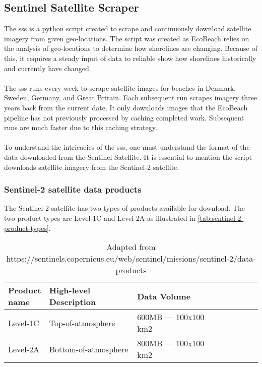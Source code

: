 \subsection{Sentinel Satellite Scraper}\label{subsec:sentinel-satellite-scraper}
The \acrfull{sss} is a python script created to scrape and continuously download satellite imagery from given geo-locations. The script was created as EcoBeach relies on the analysis of geo-locations to determine how shorelines are changing. Because of this, it requires a steady input of data to reliable show how shorelines historically and currently have changed.\\\\
\noindent
The \acrshort{sss} runs every week to scrape satellite images for beaches in Denmark, Sweden, Germany, and Great Britain. Each subsequent run scrapes imagery three years back from the current date. It only downloads images that the EcoBeach pipeline has not previously processed by caching completed work. Subsequent runs are much faster due to this caching strategy. \\\\
\noindent
To understand the intricacies of the \acrshort{sss}, one must understand the format of the data downloaded from the Sentinel Satellite. It is essential to mention the script downloads satellite imagery from the Sentinel-2 satellite.

\subsubsection{Sentinel-2 satellite data products}

The Sentinel-2 satellite has two types of products available for download. The two product types are Level-1C and Level-2A as illustrated in \autoref{tab:sentinel-2-product-types}.

\begin{table}[h!]
    \centering
    \begin{tabular}{| p{0.15\linewidth} | p{0.35\linewidth} | p{0.35\linewidth} |p{0.15\linewidth} |}
        \hline
        \textbf{Product name} & \textbf{High-level Description} & \textbf{Data Volume} \\ \hline
        Level-1C              & Top-of-atmosphere               & 600MB — 100x100 km2  \\\hline
        Level-2A              & Bottom-of-atmosphere            & 800MB — 100x100 km2  \\\hline
    \end{tabular}
    \caption{Adapted from https://sentinels.copernicus.eu/web/sentinel/missions/sentinel-2/data-products}
    \label{tab:sentinel-2-product-types}
\end{table}

